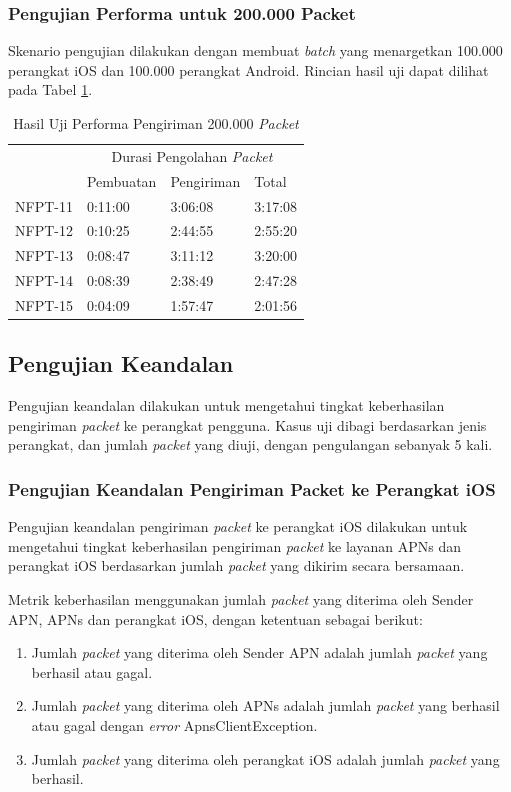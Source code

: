 \subsubsection{Pengujian Performa untuk 200.000 Packet}
\par Skenario pengujian dilakukan dengan membuat \textit{batch} yang menargetkan 100.000 perangkat iOS dan 100.000 perangkat Android. Rincian hasil uji dapat dilihat pada Tabel \ref{t:performa-200k}.
\clearpage
\begin{longtable}{|p{1.5cm}|p{2cm}|p{2cm}|p{2cm}|}
\caption{Hasil Uji Performa Pengiriman 200.000 \textit{Packet}} \label{t:performa-200k} \\ \hline
\rowcolor{lightgray} & \multicolumn{3}{c|}{Durasi Pengolahan \textit{Packet}} \\ \hhline{~|*3{-}|}
\rowcolor{lightgray} \multirow{-2}{*}{Kode} & Pembuatan & Pengiriman & Total \\ \hline
	NFPT-11 & 0:11:00 & 3:06:08 & 3:17:08 \\ \hline 
	NFPT-12 & 0:10:25 & 2:44:55 & 2:55:20 \\ \hline
	NFPT-13 & 0:08:47 & 3:11:12 & 3:20:00 \\ \hline
	NFPT-14 & 0:08:39 & 2:38:49 & 2:47:28 \\ \hline
	NFPT-15 & 0:04:09 & 1:57:47 & 2:01:56 \\ \hline
\end{longtable}

\subsection{Pengujian Keandalan}
\par Pengujian keandalan dilakukan untuk mengetahui tingkat keberhasilan pengiriman \textit{packet} ke perangkat pengguna. Kasus uji dibagi berdasarkan jenis perangkat, dan jumlah \textit{packet} yang diuji, dengan pengulangan sebanyak 5 kali.

\subsubsection{Pengujian Keandalan Pengiriman Packet ke Perangkat iOS}
\par Pengujian keandalan pengiriman \textit{packet} ke perangkat iOS dilakukan untuk mengetahui tingkat keberhasilan pengiriman \textit{packet} ke layanan APNs dan perangkat iOS berdasarkan jumlah \textit{packet} yang dikirim secara bersamaan.
\par Metrik keberhasilan menggunakan jumlah \textit{packet} yang diterima oleh Sender APN, APNs dan perangkat iOS, dengan ketentuan sebagai berikut:
\begin{enumerate}
	\item Jumlah \textit{packet} yang diterima oleh Sender APN adalah jumlah \textit{packet} yang berhasil atau gagal.
	\item Jumlah \textit{packet} yang diterima oleh APNs adalah jumlah \textit{packet} yang berhasil atau gagal dengan \textit{error} ApnsClientException.
	\item Jumlah \textit{packet} yang diterima oleh perangkat iOS adalah jumlah \textit{packet} yang berhasil.
\end{enumerate}
   

